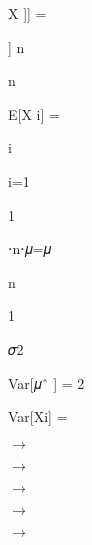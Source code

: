 \documentclass[a4paper,portrait,12pt]{article}
\begin{document}
\begin{flushleft}
X ]] =
\end{flushleft}


\begin{flushleft}
] n
\end{flushleft}





\begin{flushleft}
n
\end{flushleft}





\begin{flushleft}
E[X i] =
\end{flushleft}





\begin{flushleft}
i
\end{flushleft}





\begin{flushleft}
i=1
\end{flushleft}





1


\begin{flushleft}
⋅n⋅𝜇=𝜇
\end{flushleft}


\begin{flushleft}
n
\end{flushleft}





1


\begin{flushleft}
𝜎2
\end{flushleft}


\begin{flushleft}
Var[𝜇ˆ ] = 2
\end{flushleft}


\begin{flushleft}
Var[Xi] =
\end{flushleft}


$\rightarrow$


$\rightarrow$


$\rightarrow$


$\rightarrow$


$\rightarrow$
\end{document}
